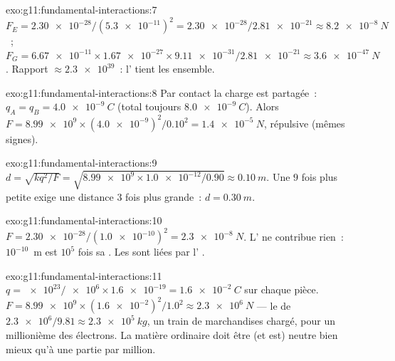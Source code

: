 \begin{solution}{exo:g11:fundamental-interactions:7}
$F_E = \num{2.30e-28}/(\num{5.3e-11})^2 = \num{2.30e-28}/\num{2.81e-21}
\approx \qty{8.2e-8}{N}$~;
$F_G = \num{6.67e-11} \times \num{1.67e-27} \times \num{9.11e-31} /
\num{2.81e-21} \approx \qty{3.6e-47}{N}$. Rapport $\approx \num{2.3e39}$~:
l' tient les
 ensemble.
\end{solution}

\begin{solution}{exo:g11:fundamental-interactions:8}
Par contact la charge est partagée~: $q_A = q_B = \qty{+4.0e-9}{C}$
(total toujours $\qty{8.0e-9}{C}$). Alors
$F = \num{8.99e9} \times (\num{4.0e-9})^2/0.10^2 =
\qty{1.4e-5}{N}$, répulsive (mêmes signes).
\end{solution}

\begin{solution}{exo:g11:fundamental-interactions:9}
$d = \sqrt{k q^2/F} = \sqrt{\num{8.99e9} \times \num{1.0e-12}/0.90}
\approx \qty{0.10}{m}$. Une  $9$ fois
plus petite exige une distance $3$ fois plus grande~: $d = \qty{0.30}{m}$.
\end{solution}

\begin{solution}{exo:g11:fundamental-interactions:10}
$F = \num{2.30e-28}/(\num{1.0e-10})^2 = \qty{2.3e-8}{N}$.
L' ne contribue rien~:
$10^{-10}$~m est $10^{5}$ fois sa
. Les
 sont liées par l'
.
\end{solution}

\begin{solution}{exo:g11:fundamental-interactions:11}
$q = \num{e23}/\num{e6} \times \num{1.6e-19} = \qty{1.6e-2}{C}$ sur
chaque pièce. $F = \num{8.99e9} \times (\num{1.6e-2})^2/1.0^2 \approx
\qty{2.3e6}{N}$ --- le  de
$\num{2.3e6}/9.81 \approx \qty{2.3e5}{kg}$, un train de marchandises
chargé, pour un millionième des électrons. La matière ordinaire doit
être (et est) neutre bien mieux qu'à une partie par million.
\end{solution}

